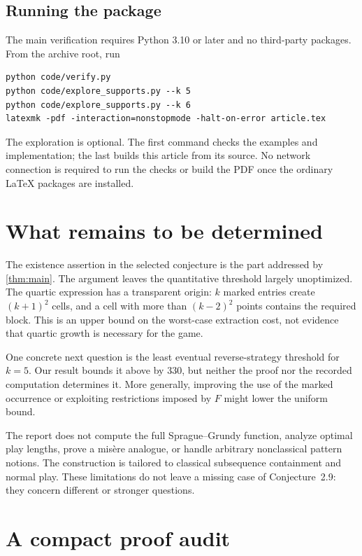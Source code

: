 \documentclass[11pt,a4paper]{article}
\theoremstyle{definition}
\theoremstyle{remark}
\begin{document}
\subsection{Running the package}
The main verification requires Python 3.10 or later and no third-party
packages. From the archive root, run
\begin{verbatim}
python code/verify.py
python code/explore_supports.py --k 5
python code/explore_supports.py --k 6
latexmk -pdf -interaction=nonstopmode -halt-on-error article.tex
\end{verbatim}
The exploration is optional. The first command checks the examples and
implementation; the last builds this article from its source. No network
connection is required to run the checks or build the PDF once the ordinary
\LaTeX{} packages are installed.

\section{What remains to be determined}
\label{sec:remaining}

The existence assertion in the selected conjecture is the part addressed
by \cref{thm:main}. The argument leaves the quantitative threshold largely
unoptimized. The quartic expression has a transparent origin: $k$ marked
entries create $(k+1)^2$ cells, and a cell with more than $(k-2)^2$ points
contains the required block. This is an upper bound on the worst-case
extraction cost, not evidence that quartic growth is necessary for the game.

One concrete next question is the least eventual reverse-strategy threshold
for $k=5$. Our result bounds it above by $330$, but neither the proof nor the
recorded computation determines it. More generally, improving the use of the
marked occurrence or exploiting restrictions imposed by $F$ might lower
the uniform bound.

The report does not compute the full Sprague--Grundy function, analyze
optimal play lengths, prove a mis\`ere analogue, or handle arbitrary
nonclassical pattern notions. The construction is tailored to classical
subsequence containment and normal play. These limitations do not leave a
missing case of Conjecture~2.9: they concern different or stronger questions.

\appendix
\section{A compact proof audit}
\label{app:audit}
\end{document}
